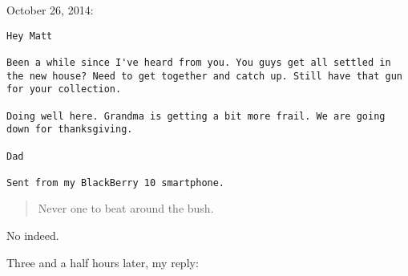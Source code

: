 October 26, 2014:

\begin{verbatim}
Hey Matt

Been a while since I've heard from you. You guys get all settled in the new house? Need to get together and catch up. Still have that gun for your collection.

Doing well here. Grandma is getting a bit more frail. We are going down for thanksgiving.

Dad

Sent from my BlackBerry 10 smartphone.
\end{verbatim}

\begin{quote}
Never one to beat around the bush.
\end{quote}

No indeed.

Three and a half hours later, my reply:

